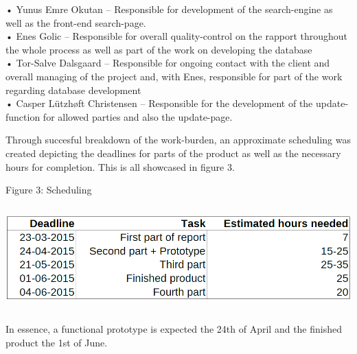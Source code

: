 \documentclass[12pt,a4paper]{article}
\begin{document}
•	Yunus Emre Okutan – Responsible for development of the search-engine as well as the front-end search-page.\\
•	Enes Golic – Responsible for overall quality-control on the rapport throughout the whole process as well as part of the work on developing the database\\
•	Tor-Salve Dalsgaard – Responsible for ongoing contact with the client and overall managing of the project and, with Enes, responsible for part of the work regarding database development\\
•	Casper Lützhøft Christensen – Responsible for the development of the update-function for allowed parties and also the update-page.

Through succesful breakdown of the work-burden, an approximate scheduling was created depicting the deadlines for parts of the product as well as the necessary hours for completion. This is all showcased in figure 3.
\newpage

\begin{center}
	Figure 3: Scheduling
	
	\includegraphics[height=40mm]{Scheduling.png}
\end{center}
In essence, a functional prototype is expected the 24th of April and the finished product the 1st of June.
\end{document}
